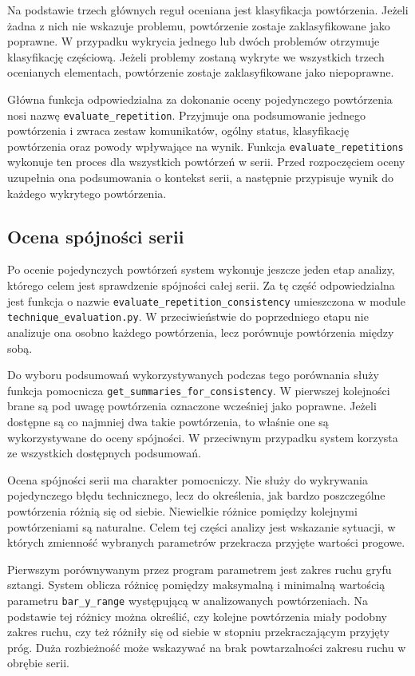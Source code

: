 Na podstawie trzech głównych reguł oceniana jest klasyfikacja powtórzenia. Jeżeli żadna z nich nie wskazuje problemu, powtórzenie zostaje zaklasyfikowane jako poprawne. W przypadku wykrycia jednego lub dwóch problemów otrzymuje klasyfikację częściową. Jeżeli problemy zostaną wykryte we wszystkich trzech ocenianych elementach, powtórzenie zostaje zaklasyfikowane jako niepoprawne.

Główna funkcja odpowiedzialna za dokonanie oceny pojedynczego powtórzenia nosi nazwę \texttt{evaluate\_repetition}. Przyjmuje ona podsumowanie jednego powtórzenia i zwraca zestaw komunikatów, ogólny status, klasyfikację powtórzenia oraz powody wpływające na wynik. Funkcja \texttt{evaluate\_repetitions} wykonuje ten proces dla wszystkich powtórzeń w serii. Przed rozpoczęciem oceny uzupełnia ona podsumowania o kontekst serii, a następnie przypisuje wynik do każdego wykrytego powtórzenia.

\subsection{Ocena spójności serii}

Po ocenie pojedynczych powtórzeń system wykonuje jeszcze jeden etap analizy, którego celem jest sprawdzenie spójności całej serii. Za tę część odpowiedzialna jest funkcja o nazwie \texttt{evaluate\_repetition\_consistency} umieszczona w module \texttt{technique\_evaluation.py}. W przeciwieństwie do poprzedniego etapu nie analizuje ona osobno każdego powtórzenia, lecz porównuje powtórzenia między sobą.

Do wyboru podsumowań wykorzystywanych podczas tego porównania służy funkcja pomocnicza \texttt{get\_summaries\_for\_consistency}. W pierwszej kolejności brane są pod uwagę powtórzenia oznaczone wcześniej jako poprawne. Jeżeli dostępne są co najmniej dwa takie powtórzenia, to właśnie one są wykorzystywane do oceny spójności. W przeciwnym przypadku system korzysta ze wszystkich dostępnych podsumowań.

Ocena spójności serii ma charakter pomocniczy. Nie służy do wykrywania pojedynczego błędu technicznego, lecz do określenia, jak bardzo poszczególne powtórzenia różnią się od siebie. Niewielkie różnice pomiędzy kolejnymi powtórzeniami są naturalne. Celem tej części analizy jest wskazanie sytuacji, w których zmienność wybranych parametrów przekracza przyjęte wartości progowe.

Pierwszym porównywanym przez program parametrem jest zakres ruchu gryfu sztangi. System oblicza różnicę pomiędzy maksymalną i minimalną wartością parametru \texttt{bar\_y\_range} występującą w analizowanych powtórzeniach. Na podstawie tej różnicy można określić, czy kolejne powtórzenia miały podobny zakres ruchu, czy też różniły się od siebie w stopniu przekraczającym przyjęty próg. Duża rozbieżność może wskazywać na brak powtarzalności zakresu ruchu w obrębie serii.

